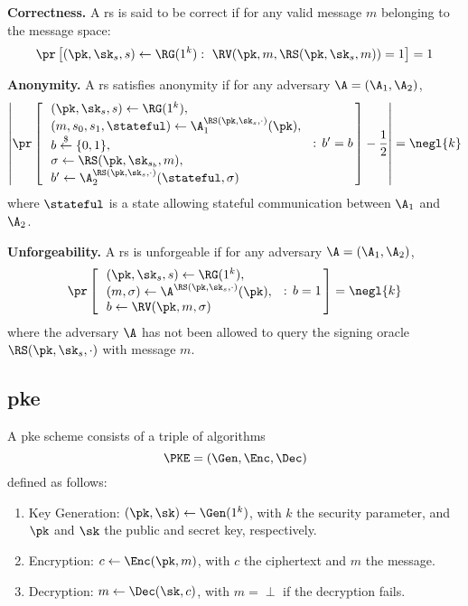 \begin{description}

\item \textbf{Correctness.} A \gls{rs} is said to be correct if for any valid message $m$ belonging to the message space:
\begin{equation*}
      \pr\left[(\pk, \sk_s,s) \gets \RG(1^k) : ~ \RV(\pk, m, \RS(\pk, \sk_s,m))=1 \right] = 1
\end{equation*}

\item \textbf{Anonymity.}  A \gls{rs} satisfies anonymity if for any \ppt adversary $\A=(\A_1,\A_2)$,
  \begin{equation*}
      \left|\pr\left[\, \begin{array}{l}
        (\pk,\sk_s,s) \gets \RG(1^k),\\
        (m,s_0,s_1,\stateful) \gets \A_1^{\RS(\pk,\sk_s,\cdot)}(\pk),\\
        b \overset{\$}{\leftarrow} \{0,1\},\\
        \sigma \gets \RS(\pk,\sk_{s_b},m),\\
        b' \gets \A_2^{\RS(\pk,\sk_s,\cdot)}(\stateful,\sigma)
      \end{array}\,: \,b'=b \,\right] - \frac{1}{2} \right| = \negl{k}
  \end{equation*}
  where $\stateful$ is a state allowing stateful communication between $\A_1$ and $\A_2$.

\item \textbf{Unforgeability.} A \gls{rs} is unforgeable if for
  any \ppt adversary $\A=(\A_1,\A_2)$,
  \begin{equation*}
      \pr\left[\, \begin{array}{l}
        (\pk,\sk_s,s) \gets \RG(1^k),\\
        (m,\sigma) \gets \A^{\RS(\pk,\sk_s,\cdot)}(\pk),\\
        b \gets \RV(\pk,m,\sigma)
      \end{array}\,: \,b=1 \,\right] = \negl{k}
  \end{equation*}
  where the adversary $\A$ has not been allowed
  to query the signing oracle $\RS(\pk, \sk_s, \cdot)$ with message $m$.
\end{description}

\subsection{\acrlong{pke}}
A \gls{pke} scheme consists of a triple of \ppt
algorithms 
\begin{equation*}
    \PKE=(\Gen, \Enc, \Dec)
\end{equation*}
defined as follows:
\begin{enumerate}
\item Key Generation: $(\pk, \sk) \gets \Gen(1^k)$, with $k$ the security parameter, and $\pk$ and $\sk$ the public and secret key, respectively.
\item Encryption: $c \gets \Enc(\pk,m)$, with $c$ the ciphertext and $m$ the message.
\item Decryption: $m \gets \Dec(\sk,c)$, with $m=\perp$ if the decryption fails.
\end{enumerate}

